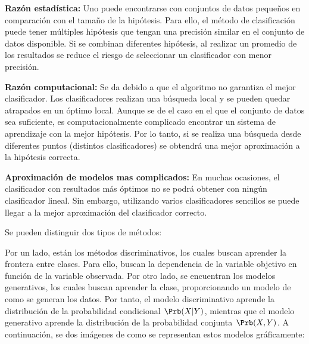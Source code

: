 \textbf{Razón estadística: } Uno puede encontrarse con conjuntos de datos pequeños en comparación con el tamaño de la hipótesis. Para ello, el método de clasificación puede tener múltiples hipótesis que tengan una precisión similar en el conjunto de datos disponible. Si se combinan diferentes hipótesis, al realizar un promedio de los resultados se reduce el riesgo de seleccionar un clasificador con menor precisión.

\textbf{Razón computacional: } Se da debido a que el algoritmo no garantiza el mejor clasificador. Los clasificadores realizan una búsqueda local y se pueden quedar atrapados en un óptimo local. Aunque se de el caso en el que el conjunto de datos sea suficiente, es computacionalmente complicado encontrar un sistema de aprendizaje con la mejor hipótesis. Por lo tanto, si se realiza una búsqueda desde diferentes puntos (distintos clasificadores) se obtendrá una mejor aproximación a la hipótesis correcta.

\textbf{Aproximación de modelos mas complicados: } En muchas ocasiones, el clasificador con resultados más óptimos no se podrá obtener con ningún clasificador lineal. Sin embargo, utilizando varios clasificadores sencillos se puede llegar a la mejor aproximación del clasificador correcto. 

Se pueden distinguir dos tipos de métodos:

Por un lado, están los métodos discriminativos, los cuales buscan aprender la frontera entre clases. Para ello, buscan la dependencia de la variable objetivo en función de la variable observada. Por otro lado, se encuentran los modelos generativos, los cuales buscan aprender la clase, proporcionando un modelo de como se generan los datos. Por tanto, el modelo discriminativo aprende la distribución de la probabilidad condicional $\Prb(X|Y)$, mientras que el modelo generativo aprende la distribución de la probabilidad conjunta $\Prb(X,Y)$. A continuación, se dos imágenes de como se representan estos modelos gráficamente:
\begin{figure}[ht]
	\centering
		\label{fig: Métodos de clasificación}
\end{figure}


